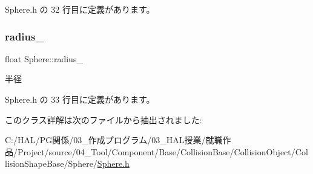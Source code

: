  Sphere.\+h の 32 行目に定義があります。

\mbox{\label{class_sphere_ac2924d9ad22bfad1ed1914c069c188dc}} 
\subsubsection{\texorpdfstring{radius\+\_\+}{radius\_}}
{\footnotesize\ttfamily float Sphere\+::radius\+\_\+\hspace{0.3cm}{\ttfamily [private]}}



半径 



 Sphere.\+h の 33 行目に定義があります。



このクラス詳解は次のファイルから抽出されました\+:\begin{DoxyCompactItemize}
\item 
C\+:/\+H\+A\+L/\+P\+G関係/03\+\_\+作成プログラム/03\+\_\+\+H\+A\+L授業/就職作品/\+Project/source/04\+\_\+\+Tool/\+Component/\+Base/\+Collision\+Base/\+Collision\+Object/\+Collision\+Shape\+Base/\+Sphere/\mbox{\hyperlink{_sphere_8h}{Sphere.\+h}}\end{DoxyCompactItemize}
